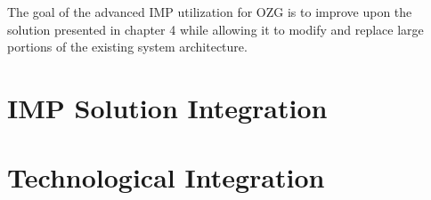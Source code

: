
The goal of the advanced IMP utilization for OZG is to improve upon the solution presented in chapter 4 while allowing it to modify and replace large portions of the existing system architecture. 

\section{IMP Solution Integration}



\section{Technological Integration}

